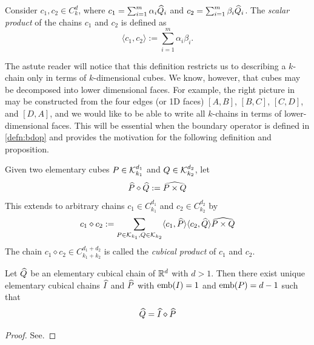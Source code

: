\begin{defn} \label{defn:chainprod}
	Consider $c_1, c_2 \in C_k^d$, where $c_1 = \sum_{i=1}^m \alpha_i \widehat{Q}_i $ and $ c_2 = \sum_{i=1}^m \beta_i \widehat{Q}_i $. The \textit{scalar product} of the chains $c_1$ and $c_2$ is defined as
	$$ \langle c_1, c_2 \rangle := \sum_{i=1}^m \alpha_i \beta_i . $$
\end{defn}

The astute reader will notice that this definition restricts us to describing a $k$-chain only in terms of $k$-dimensional cubes. We know, however, that cubes may be decomposed into lower dimensional faces. For example, the right picture in  may be constructed from the four edges (or 1D faces) $[A,B]$, $[B,C]$, $[C,D]$, and $[D,A]$, and we would like to be able to write all $k$-chains in terms of lower-dimensional faces. This will be essential when the boundary operator is defined in \ref{defn:bdop} and provides the motivation for the following definition and proposition.

\begin{defn}
	Given two elementary cubes $P \in \mathcal{K}_{k_1}^{d_1} $ and $ Q \in \mathcal{K}_{k_2}^{d_2} $, let
	$$ \widehat{P} \diamond \widehat{Q} := \widehat{ P \times Q } $$
	This extends to arbitrary chains $ c_1 \in C_{k_1}^{d_1} $ and $ c_2 \in C_{k_2}^{d_2} $ by
	$$ c_1 \diamond c_2 := \sum_{P \in \mathcal{K}_{k_1}, Q \in \mathcal{K}_{k_2} } \langle c_1, \widehat{P} \rangle \langle c_2, \widehat{Q} \rangle \widehat{ P \times Q} $$
	The chain $ c_1 \diamond c_2 \in C_{k_1 + k_2}^{d_1 + d_2} $ is called the \textit{cubical product} of $c_1$ and $c_2$.
\end{defn}

\begin{prop} \label{prop:chainprod}
	Let $\widehat{Q}$ be an elementary cubical chain of $\mathbb{R}^d$ with $d > 1$. Then there exist unique elementary cubical chains $\widehat{I}$ and $\widehat{P}$ with $\mathord{\mathrm{emb}(I)} = 1$ and $\mathord{\mathrm{emb}(P)} = d - 1$ such that
	$$ \widehat{Q} = \widehat{I} \diamond \widehat{P} $$
\end{prop}
%
\begin{proof}
	See.
\end{proof}

